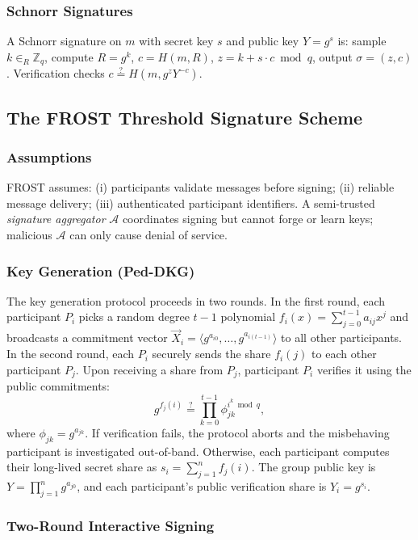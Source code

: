 \subsubsection{Schnorr Signatures}

A Schnorr signature on \(m\) with secret key \(s\) and public key \(Y=g^s\) is: sample \(k\in_R\mathbb{Z}_q\), compute \(R=g^k\), \(c=H(m,R)\), \(z=k+s\cdot c\bmod q\), output \(\sigma=(z,c)\). Verification checks \(c\stackrel{?}{=}H(m,g^zY^{-c})\).

\subsection{The FROST Threshold Signature Scheme}

\subsubsection{Assumptions}

FROST assumes: (i) participants validate messages before signing; (ii) reliable message delivery; (iii) authenticated participant identifiers. A semi-trusted \emph{signature aggregator} \(\mathcal{A}\) coordinates signing but cannot forge or learn keys; malicious \(\mathcal{A}\) can only cause denial of service.

\subsubsection{Key Generation (Ped-DKG)}

The key generation protocol proceeds in two rounds. In the first round, each participant \(P_i\) picks a random degree \(t-1\) polynomial \(f_i(x)=\sum_{j=0}^{t-1}a_{ij}x^j\) and broadcasts a commitment vector \(\vec{X}_i = \langle g^{a_{i0}},\ldots,g^{a_{i(t-1)}}\rangle\) to all other participants. In the second round, each \(P_i\) securely sends the share \(f_i(j)\) to each other participant \(P_j\). Upon receiving a share from \(P_j\), participant \(P_i\) verifies it using the public commitments:
\[
g^{f_j(i)}\stackrel{?}{=}\prod_{k=0}^{t-1}\phi_{jk}^{i^k\bmod q},
\]
where \(\phi_{jk}=g^{a_{jk}}\). If verification fails, the protocol aborts and the misbehaving participant is investigated out-of-band. Otherwise, each participant computes their long-lived secret share as \(s_i=\sum_{j=1}^n f_j(i)\). The group public key is \(Y=\prod_{j=1}^n g^{a_{j0}}\), and each participant's public verification share is \(Y_i=g^{s_i}\).

\subsubsection{Two-Round Interactive Signing}

